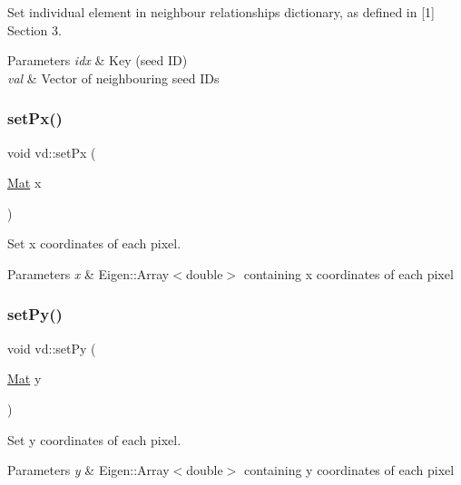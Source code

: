 Set individual element in neighbour relationships dictionary, as defined in \mbox{[}1\mbox{]} Section 3. 


\begin{DoxyParams}{Parameters}
{\em idx} & Key (seed ID) \\
\hline
{\em val} & Vector of neighbouring seed I\+Ds \\
\hline
\end{DoxyParams}
\mbox{\label{classvd_a579df0c885a43bb876449889bbcba6cb}} 
\subsubsection{\texorpdfstring{set\+Px()}{setPx()}}
{\footnotesize\ttfamily void vd\+::set\+Px (\begin{DoxyParamCaption}\item[{\mbox{\hyperlink{typedefs_8h_a9fa28c1f74e909474857584f5c7b0088}{Mat}}}]{x }\end{DoxyParamCaption})}



Set x coordinates of each pixel. 


\begin{DoxyParams}{Parameters}
{\em x} & Eigen\+::\+Array$<$double$>$ containing x coordinates of each pixel \\
\hline
\end{DoxyParams}
\mbox{\label{classvd_a8314de29eacf72f10afee2c67b0c9819}} 
\subsubsection{\texorpdfstring{set\+Py()}{setPy()}}
{\footnotesize\ttfamily void vd\+::set\+Py (\begin{DoxyParamCaption}\item[{\mbox{\hyperlink{typedefs_8h_a9fa28c1f74e909474857584f5c7b0088}{Mat}}}]{y }\end{DoxyParamCaption})}



Set y coordinates of each pixel. 


\begin{DoxyParams}{Parameters}
{\em y} & Eigen\+::\+Array$<$double$>$ containing y coordinates of each pixel \\
\hline
\end{DoxyParams}
\mbox{\label{classvd_a0b4c53a592ec499899a37c2e6364806a}} 
